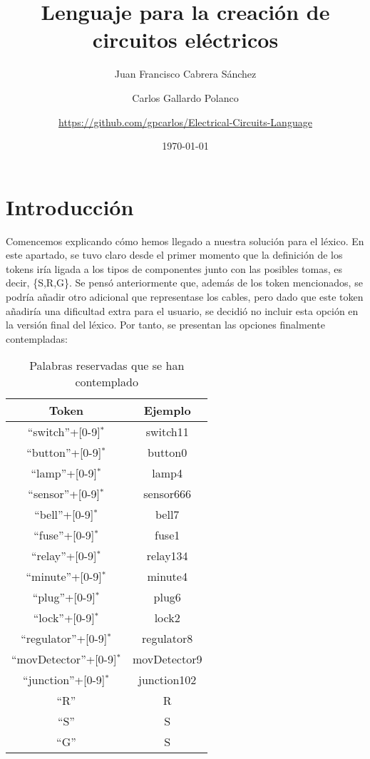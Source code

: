 \documentclass{article}
\author{Juan Francisco Cabrera Sánchez \and Carlos Gallardo Polanco \and \newline \url{https://github.com/gpcarlos/Electrical-Circuits-Language}}
\title{Lenguaje para la creación de circuitos eléctricos}
\date{\today}
\begin{document}
\maketitle

\section{Introducción}
Comencemos explicando cómo hemos llegado a nuestra solución para el léxico. En este apartado, se tuvo claro desde el primer momento que la definición de los tokens iría ligada a los tipos de componentes junto con las posibles tomas, es decir, \{S,R,G\}. Se pensó anteriormente que, además de los token mencionados, se podría añadir otro adicional que representase los cables, pero dado que este token añadiría una dificultad extra para el usuario, se decidió no incluir esta opción en la versión final del léxico. Por tanto, se presentan las opciones finalmente contempladas:

\begin{table}[h!]
  \centering
  \begin{tabular}{|c|c|}
    \hline
    Token & Ejemplo \\ \hline
  ``switch''+[0-9]$^*$ & switch11 \\ \hline
  ``button''+[0-9]$^*$ & button0 \\ \hline
  ``lamp''+[0-9]$^*$ & lamp4 \\ \hline
  ``sensor''+[0-9]$^*$ & sensor666 \\ \hline
  ``bell''+[0-9]$^*$ & bell7 \\ \hline
  ``fuse''+[0-9]$^*$ & fuse1 \\ \hline
  ``relay''+[0-9]$^*$ & relay134 \\ \hline
  ``minute''+[0-9]$^*$ & minute4 \\ \hline
  ``plug''+[0-9]$^*$ & plug6 \\ \hline
  ``lock''+[0-9]$^*$ & lock2 \\ \hline
  ``regulator''+[0-9]$^*$ & regulator8 \\ \hline
  ``movDetector''+[0-9]$^*$ & movDetector9 \\ \hline
  ``junction''+[0-9]$^*$ & junction102 \\ \hline
  ``R'' & R \\ \hline
  ``S'' & S \\ \hline
  ``G'' & S \\ \hline
  \end{tabular}
  \caption{Palabras reservadas que se han contemplado}
  \label{}
\end{table}
\end{document}
